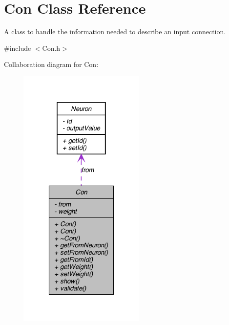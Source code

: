\hypertarget{class_con}{
\section{Con Class Reference}
\label{class_con}
}


A class to handle the information needed to describe an input connection.  




{\ttfamily \#include $<$Con.h$>$}



Collaboration diagram for Con:
\nopagebreak
\begin{figure}[H]
\begin{center}
\leavevmode
\includegraphics[width=178pt]{class_con__coll__graph}
\end{center}
\end{figure}
